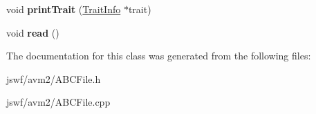 \begin{DoxyCompactItemize}
\item 
\hypertarget{classjswf_1_1avm2_1_1_a_b_c_file_a6b89176515a4370b81a371e4ae60d124}{void {\bfseries print\+Trait} (\hyperlink{structjswf_1_1avm2_1_1_trait_info}{Trait\+Info} $\ast$trait)}\label{classjswf_1_1avm2_1_1_a_b_c_file_a6b89176515a4370b81a371e4ae60d124}

\item 
\hypertarget{classjswf_1_1avm2_1_1_a_b_c_file_aa0788ded9794a409fa423c225b11fdad}{void {\bfseries read} ()}\label{classjswf_1_1avm2_1_1_a_b_c_file_aa0788ded9794a409fa423c225b11fdad}

\end{DoxyCompactItemize}


The documentation for this class was generated from the following files\+:\begin{DoxyCompactItemize}
\item 
jswf/avm2/A\+B\+C\+File.\+h\item 
jswf/avm2/A\+B\+C\+File.\+cpp\end{DoxyCompactItemize}
